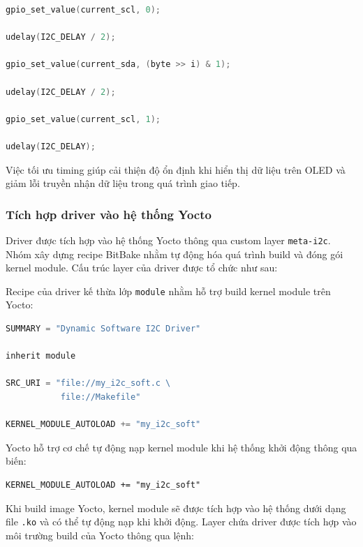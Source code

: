 \begin{lstlisting}[style=thesisstyle, language=C]
gpio_set_value(current_scl, 0);

udelay(I2C_DELAY / 2);

gpio_set_value(current_sda, (byte >> i) & 1);

udelay(I2C_DELAY / 2);

gpio_set_value(current_scl, 1);

udelay(I2C_DELAY);
\end{lstlisting}

Việc tối ưu timing giúp cải thiện độ ổn định khi hiển thị dữ liệu trên OLED và giảm lỗi truyền nhận dữ liệu trong quá trình giao tiếp.

\subsubsection{Tích hợp driver vào hệ thống Yocto}

Driver được tích hợp vào hệ thống Yocto thông qua custom layer \texttt{meta-i2c}. Nhóm xây dựng recipe BitBake nhằm tự động hóa quá trình build và đóng gói kernel module.
Cấu trúc layer của driver được tổ chức như sau:

\medskip 

\renewcommand*\DTstyle{\ttfamily} 

Recipe của driver kế thừa lớp \texttt{module} nhằm hỗ trợ build kernel module trên Yocto:

\begin{lstlisting}[style=thesisstyle, language=C]
SUMMARY = "Dynamic Software I2C Driver"

inherit module

SRC_URI = "file://my_i2c_soft.c \
           file://Makefile"

KERNEL_MODULE_AUTOLOAD += "my_i2c_soft"
\end{lstlisting}

Yocto hỗ trợ cơ chế tự động nạp kernel module khi hệ thống khởi động thông qua biến:

\begin{verbatim}
KERNEL_MODULE_AUTOLOAD += "my_i2c_soft"
\end{verbatim}


Khi build image Yocto, kernel module sẽ được tích hợp vào hệ thống dưới dạng file \texttt{.ko} và có thể tự động nạp khi khởi động.
Layer chứa driver được tích hợp vào môi trường build của Yocto thông qua lệnh:

